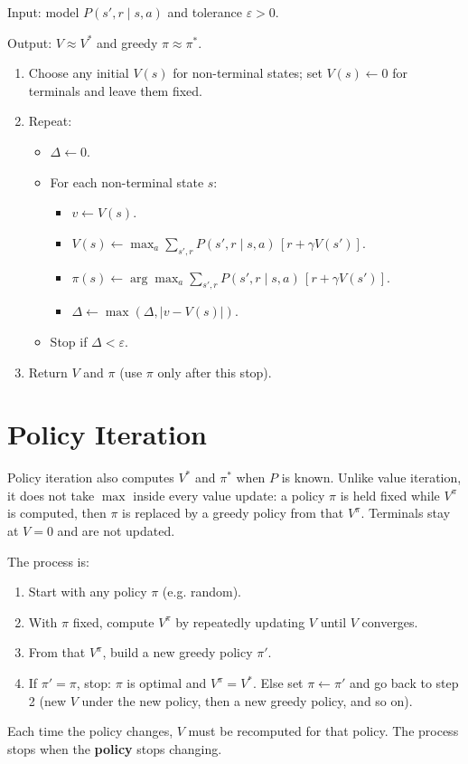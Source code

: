 \begin{implnote}
Input: model $P(s',r\mid s,a)$ and tolerance $\varepsilon>0$.

Output: $V\approx V^*$ and greedy $\pi\approx\pi^*$.

\begin{enumerate}
\item Choose any initial $V(s)$ for non-terminal states; set $V(s)\leftarrow 0$ for terminals and leave them fixed.
\item Repeat:
\begin{itemize}
\item $\Delta\leftarrow 0$.
\item For each non-terminal state $s$:
\begin{itemize}
\item $v\leftarrow V(s)$.
\item $V(s)\leftarrow\max_a\sum_{s',r} P(s',r\mid s,a)\,[r+\gamma V(s')]$.
\item $\pi(s)\leftarrow\arg\max_a\sum_{s',r} P(s',r\mid s,a)\,[r+\gamma V(s')]$.
\item $\Delta\leftarrow\max(\Delta,|v-V(s)|)$.
\end{itemize}
\item Stop if $\Delta<\varepsilon$.
\end{itemize}
\item Return $V$ and $\pi$ (use $\pi$ only after this stop).
\end{enumerate}

\end{implnote}




\section{Policy Iteration}
Policy iteration also computes $V^*$ and $\pi^*$ when $P$ is known. Unlike value iteration, it does not take $\max$ inside every value update: a policy $\pi$ is held fixed while $V^\pi$ is computed, then $\pi$ is replaced by a greedy policy from that $V^\pi$. Terminals stay at $V=0$ and are not updated.

The process is:
\begin{enumerate}
\item Start with any policy $\pi$ (e.g. random).
\item With $\pi$ fixed, compute $V^\pi$ by repeatedly updating $V$ until $V$ converges.
\item From that $V^\pi$, build a new greedy policy $\pi'$.
\item If $\pi'=\pi$, stop: $\pi$ is optimal and $V^\pi=V^*$. Else set $\pi\leftarrow\pi'$ and go back to step 2 (new $V$ under the new policy, then a new greedy policy, and so on).
\end{enumerate}
Each time the policy changes, $V$ must be recomputed for that policy. The process stops when the \textbf{policy} stops changing.

